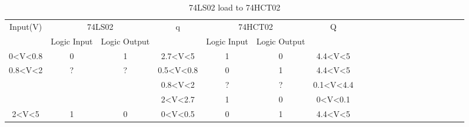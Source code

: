 	\begin{center}
	\hspace{1cm}\begin{table}[h!]
	\begin{tabular}{llllllllllllllllllll}
	\cline{1-7}
	\multicolumn{1}{|c|}{\multirow{2}{*}{Input(V)}} & \multicolumn{2}{c|}{74LS02} & \multicolumn{1}{c|}{\multirow{2}{*}{q}} & \multicolumn{2}{c|}{74HCT02} & \multicolumn{1}{c|}{\multirow{2}{*}{Q}}  \\ \cline{2-3} \cline{5-6}
	\multicolumn{1}{|c|}{} & \multicolumn{1}{c|}{Logic Input} & \multicolumn{1}{c|}{Logic Output} & \multicolumn{1}{c|}{} & \multicolumn{1}{c|}{Logic Input} & \multicolumn{1}{c|}{Logic Output} & \multicolumn{1}{c|}{}  \\ \cline{1-7}
	\multicolumn{1}{|c|}{0\textless{}V\textless{}0.8} & \multicolumn{1}{c|}{0} & \multicolumn{1}{c|}{1} & \multicolumn{1}{c|}{2.7\textless{}V\textless{}5} & \multicolumn{1}{c|}{1} & \multicolumn{1}{c|}{0} & \multicolumn{1}{c|}{4.4\textless{}V\textless{}5}  \\ \cline{1-7}
	\multicolumn{1}{|c|}{\multirow{3}{*}{0.8\textless{}V\textless{}2}} & \multicolumn{1}{c|}{\multirow{3}{*}{?}} & \multicolumn{1}{c|}{\multirow{3}{*}{?}} & \multicolumn{1}{c|}{0.5\textless{}V\textless{}0.8} & \multicolumn{1}{c|}{0} & \multicolumn{1}{c|}{1} & \multicolumn{1}{c|}{4.4\textless{}V\textless{}5}  \\ \cline{4-7}
	\multicolumn{1}{|c|}{} & \multicolumn{1}{c|}{} & \multicolumn{1}{c|}{} & \multicolumn{1}{c|}{0.8\textless{}V\textless{}2} & \multicolumn{1}{c|}{?} & \multicolumn{1}{c|}{?} & \multicolumn{1}{c|}{0.1\textless{}V\textless{}4.4}  \\ \cline{4-7}
	\multicolumn{1}{|c|}{} & \multicolumn{1}{c|}{} & \multicolumn{1}{c|}{} & \multicolumn{1}{c|}{2\textless{}V\textless{}2.7} & \multicolumn{1}{c|}{1} & \multicolumn{1}{c|}{0} & \multicolumn{1}{c|}{0\textless{}V\textless{}0.1}  \\ \cline{1-7}
	\multicolumn{1}{|c|}{2\textless{}V\textless{}5} & \multicolumn{1}{c|}{1} & \multicolumn{1}{c|}{0} & \multicolumn{1}{c|}{0\textless{}V\textless{}0.5} & \multicolumn{1}{c|}{0} & \multicolumn{1}{c|}{1} & \multicolumn{1}{c|}{4.4\textless{}V\textless{}5}\\ \cline{1-7}
	\end{tabular}
	\caption{\color{cyan}74LS02 load to 74HCT02}
	\label{fig:ej2thlstohct}
	\end{table}
	\end{center}
	
